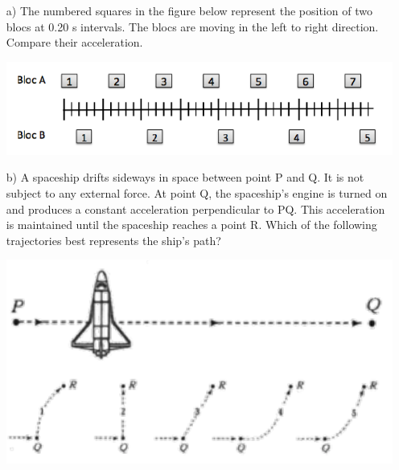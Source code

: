 %
%
\begin{center}
\vspace*{5mm}
\end{center}

\begin{enumerate}
\item[a)] The numbered squares in the figure below represent the position of two blocs at 0.20 s intervals. The blocs are moving in the left to right direction. Compare their acceleration.
\begin{center}
\includegraphics{figures/serie01_concept1.pdf}
\end{center}

\item[b)] A spaceship drifts sideways in space between point P and Q. It is not subject to any external force. At point Q, the spaceship's engine is turned on and produces a constant acceleration perpendicular to PQ. This acceleration is maintained until the spaceship reaches a point R. Which of the following trajectories best represents the ship's path?

\begin{center}
\includegraphics{figures/serie01_concept2.pdf}
\end{center}
\end{enumerate}
